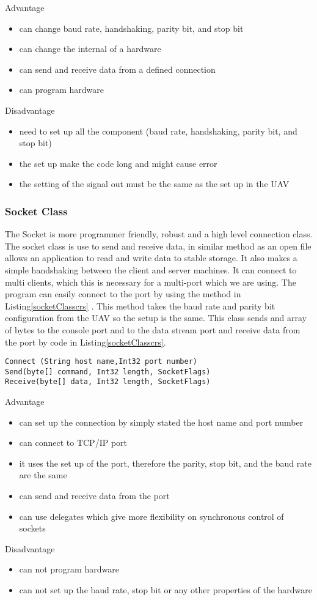 Advantage 
\begin{itemize}
\item can change baud rate, handshaking, parity bit, and stop bit
\item can change the internal of a hardware
\item can send and receive data from a defined connection
\item can program hardware
\end{itemize}
Disadvantage
\begin{itemize}
\item need to set up all the component (baud rate, handshaking, parity bit, and stop bit)
\item the set up make the code long and might cause error
\item the setting of the signal out must be the same as the set up in the UAV
\end{itemize}

\subsubsection{Socket Class}
The Socket is more programmer friendly, robust and a high level connection class. 
The socket class is use to send and receive data, in similar method as an open file allows an application to read and write data to stable storage.  
It also makes a simple handshaking between the client and server machines. 
It can connect to multi clients, which this is necessary for a multi-port which we are using. 
The program can easily connect to the port by using the method in Listing\ref{socketClasscrs} .
This method takes the baud rate and parity bit configuration from the UAV so the setup is the same. 
This class sends and array of bytes to the console port and to the data stream port and receive data from the port by code in Listing\ref{socketClasscrs}.

\begin{lstlisting}[caption=Socket class connect receive and send method,label=socketClasscrs]
Connect (String host name,Int32 port number)
Send(byte[] command, Int32 length, SocketFlags)
Receive(byte[] data, Int32 length, SocketFlags)
\end{lstlisting}

Advantage
\begin{itemize}
\item can set up the connection by simply stated the host name and port number
\item can connect to TCP/IP port 
\item it uses the set up of the port, therefore the parity, stop bit, and the baud rate are the same
\item can send and receive data from the port
\item can use delegates which give more flexibility on synchronous control of sockets \cite{robertH}
\end{itemize}
Disadvantage
\begin{itemize}
\item can not program hardware
\item can not set up the baud rate, stop bit or any other properties of the hardware
\end{itemize}

